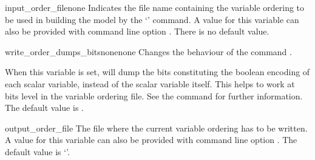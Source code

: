 





\begin{nusmvVar} {input\_order\_file}{}{none}
\label{input_order_file}
Indicates the file name containing the variable ordering to be used in
building the model by the `' command.
%
A value for this variable can also be provided with command line
option .
%
There is no default value.
\end{nusmvVar}

\begin{nusmvVar} {write\_order\_dumps\_bits}{none}{none}
Changes the behaviour of the command .

When this variable is set,  will dump the bits
constituting the boolean encoding of each scalar variable, instead of
the scalar variable itself. This helps to work at bits level in the
variable ordering file. See the command  for
further information. The default value is .
\end{nusmvVar}



\begin{nusmvVar} {output\_order\_file}{}
{}
%
The file where the current variable ordering has to be written. A
value for this variable can also be provided with command line option
.
%
The default value is `'.
%
\end{nusmvVar}

